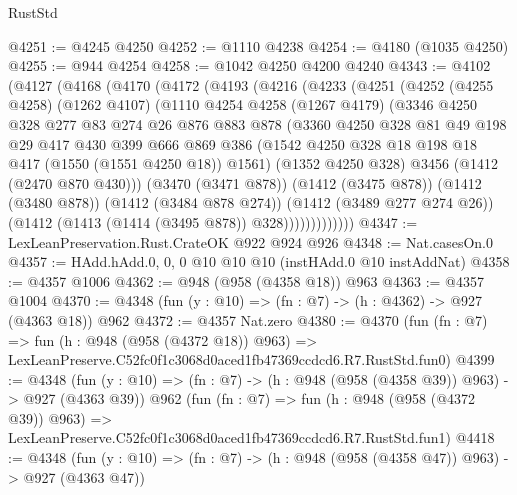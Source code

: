 \begin{lexlean}{RustStd}
\begin{coremodule}
@4251 := @4245 @4250
@4252 := @1110 @4238
@4254 := @4180 (@1035 @4250)
@4255 := @944 @4254
@4258 := @1042 @4250 @4200 @4240
@4343 := @4102
    (@4127
      (@4168
        (@4170
          (@4172
            (@4193
              (@4216
                (@4233
                  (@4251
                    (@4252
                      (@4255 @4258)
                      (@1262 @4107)
                      (@1110
                        @4254
                        @4258
                        (@1267 @4179)
                        (@3346
                          @4250
                          @328
                          @277
                          @83
                          @274
                          @26
                          @876
                          @883
                          @878
                          (@3360
                            @4250
                            @328
                            @81
                            @49
                            @198
                            @29
                            @417
                            @430
                            @399
                            @666
                            @869
                            @386
                            (@1542 @4250 @328 @18 @198 @18 @417 (@1550 (@1551 @4250 @18)) @1561)
                            (@1352 @4250 @328)
                            @3456
                            (@1412 (@2470 @870 @430)))
                          (@3470 (@3471 @878))
                          (@1412 (@3475 @878))
                          (@1412 (@3480 @878))
                          (@1412 (@3484 @878 @274))
                          (@1412 (@3489 @277 @274 @26))
                          (@1412 (@1413 (@1414 (@3495 @878)) @328)))))))))))))
@4347 := LexLeanPreservation.Rust.CrateOK @922 @924 @926
@4348 := Nat.casesOn.{0}
@4357 := HAdd.hAdd.{0, 0, 0} @10 @10 @10 (instHAdd.{0} @10 instAddNat)
@4358 := @4357 @1006
@4362 := @948 (@958 (@4358 @18)) @963
@4363 := @4357 @1004
@4370 := @4348 (fun (y : @10) => (fn : @7) -> (h : @4362) -> @927 (@4363 @18)) @962
@4372 := @4357 Nat.zero
@4380 := @4370
    (fun (fn : @7) =>
    fun (h : @948 (@958 (@4372 @18)) @963) =>
    LexLeanPreserve.C52fc0f1c3068d0aced1fb47369ccdcd6.R7.RustStd.fun0)
@4399 := @4348
    (fun (y : @10) => (fn : @7) -> (h : @948 (@958 (@4358 @39)) @963) -> @927 (@4363 @39))
    @962
    (fun (fn : @7) =>
    fun (h : @948 (@958 (@4372 @39)) @963) =>
    LexLeanPreserve.C52fc0f1c3068d0aced1fb47369ccdcd6.R7.RustStd.fun1)
@4418 := @4348
    (fun (y : @10) => (fn : @7) -> (h : @948 (@958 (@4358 @47)) @963) -> @927 (@4363 @47))

\end{coremodule}
\end{lexlean}
